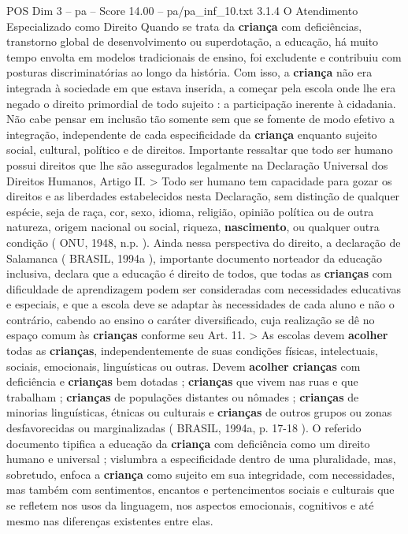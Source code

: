 \begin{textsample}{POS Dim 3 – pa – Score 14.00 – pa/pa\_inf\_10.txt}  \label{ex:f3_pos_237}
3.1.4 O Atendimento Especializado como Direito Quando se trata da \textbf{criança} com deficiências, transtorno global de desenvolvimento ou superdotação, a educação, há muito tempo envolta em modelos tradicionais de ensino, foi excludente e contribuiu com posturas discriminatórias ao longo da história.
Com isso, a \textbf{criança} não era integrada à sociedade em que estava inserida, a começar pela escola onde lhe era negado o direito primordial de todo sujeito : a participação inerente à cidadania.
Não cabe pensar em inclusão tão somente sem que se fomente de modo efetivo a integração, independente de cada especificidade da \textbf{criança} enquanto sujeito social, cultural, político e de direitos.
Importante ressaltar que todo ser humano possui direitos que lhe são assegurados legalmente na Declaração Universal dos Direitos Humanos, Artigo II. > Todo ser humano tem capacidade para gozar os direitos e as liberdades estabelecidos nesta Declaração, sem distinção de qualquer espécie, seja de raça, cor, sexo, idioma, religião, opinião política ou de outra natureza, origem nacional ou social, riqueza, \textbf{nascimento}, ou qualquer outra condição ( ONU, 1948, n.p. ).
Ainda nessa perspectiva do direito, a declaração de Salamanca ( BRASIL, 1994a ), importante documento norteador da educação inclusiva, declara que a educação é direito de todos, que todas as \textbf{crianças} com dificuldade de aprendizagem podem ser consideradas com necessidades educativas e especiais, e que a escola deve se adaptar às necessidades de cada aluno e não o contrário, cabendo ao ensino o caráter diversificado, cuja realização se dê no espaço comum às \textbf{crianças} conforme seu Art. 11. > As escolas devem \textbf{acolher} todas as \textbf{crianças}, independentemente de suas condições físicas, intelectuais, sociais, emocionais, linguísticas ou outras.
Devem \textbf{acolher} \textbf{crianças} com deficiência e \textbf{crianças} bem dotadas ; \textbf{crianças} que vivem nas ruas e que trabalham ; \textbf{crianças} de populações distantes ou nômades ; \textbf{crianças} de minorias linguísticas, étnicas ou culturais e \textbf{crianças} de outros grupos ou zonas desfavorecidas ou marginalizadas ( BRASIL, 1994a, p. 17-18 ).
O referido documento tipifica a educação da \textbf{criança} com deficiência como um direito humano e universal ; vislumbra a especificidade dentro de uma pluralidade, mas, sobretudo, enfoca a \textbf{criança} como sujeito em sua integridade, com necessidades, mas também com sentimentos, encantos e pertencimentos sociais e culturais que se refletem nos usos da linguagem, nos aspectos emocionais, cognitivos e até mesmo nas diferenças existentes entre elas.

\end{textsample}
